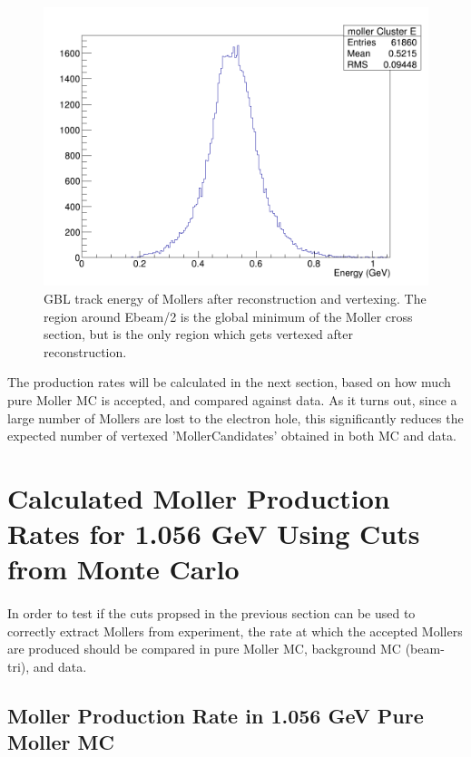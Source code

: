 \documentclass{article}
\begin{document}
          \begin{figure}[H]
  	\includegraphics[width=\linewidth]{puremollerMC/RAW_moller_E.png}
  	\caption{GBL track energy of Mollers after reconstruction and vertexing. The region around Ebeam/2 is the global minimum of the Moller cross section, but is the only region which gets vertexed after reconstruction.}
  	\label{fig:reconE}
	\end{figure}

The production rates will be calculated in the next section, based on how much pure Moller MC is accepted, and compared against data. As it turns out, since a large number of Mollers are lost to the electron hole, this significantly reduces the expected number of vertexed 'MollerCandidates' obtained in both MC and data.

	\section{Calculated Moller Production Rates for 1.056 GeV Using Cuts from Monte Carlo}
	\paragraph{}
	In order to test if the cuts propsed in the previous section can be used to correctly extract Mollers from experiment, the rate at which the accepted Mollers are produced should be compared in pure Moller MC, background MC (beam-tri), and data.
	
	\subsection{Moller Production Rate in 1.056 GeV Pure Moller MC}
\end{document}
